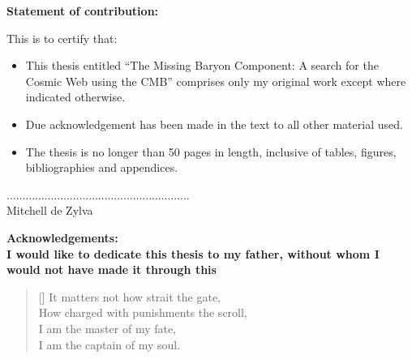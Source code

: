 


\bfseries{Statement of contribution:}\mdseries\\
\vspace{1.0cm}

This is to certify that:\\

\begin{itemize}

\item This thesis entitled ``The Missing Baryon Component: A search for the Cosmic Web using the CMB'' comprises only my original work except where indicated otherwise.

\item Due acknowledgement has been made in the text to all other material used.

\item The thesis is no longer than 50 pages in length, inclusive of tables, figures, bibliographies and
appendices.

\end{itemize}

\vspace{4.0cm}


\scriptsize{..........................................................}\normalsize\\
\newline
\vspace{3.0cm}
\indent Mitchell de Zylva\\
      					 
\vspace{2.0cm}



\bfseries{Acknowledgements:}\mdseries\\

I would like to dedicate this thesis to my father, without whom I would not have made it through this\\

\settowidth{\versewidth}{How charged with punishments the scroll}
\begin{verse}[\versewidth]
It matters not how strait the gate,\\
      How charged with punishments the scroll,\\
I am the master of my fate,\\
      I am the captain of my soul. 
\end{verse}